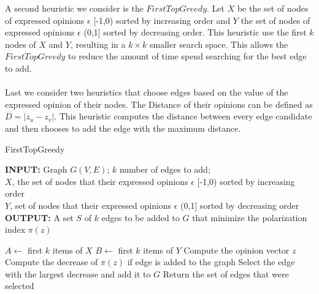 \noindent A second heuristic we consider is the $FirstTopGreedy$. Let $X$ be the set of nodes of expressed opinions $\epsilon$ [-1,0) sorted by increasing order and $Y$ the set of nodes of expressed opinions $\epsilon$ (0,1] sorted by decreasing order. This heuristic use the first $k$ nodes of $X$ and $Y$, resulting in  a $k \times k$ smaller search space. This allows the $FirstTopGreedy$ to reduce the amount of time spend searching for the best edge to add. \noindent 
\\
\\
Last we consider two heuristics that choose edges based on the value of the expressed opinion of their nodes. The Distance of their opinions can be defined as $D=|z_u - z_v|$. This heuristic computes the distance between every edge candidate and then chooses to add the edge with the maximum distance.

\begin{algorithm}[htbp]
	\caption{FirstTopGreedy}
	\label{alg:kgreedy}
	
	\begin{flushleft}
        		\textbf{INPUT:} Graph $G(V, E)$; $k$ number of edges to add;\\
		$X$, the set of nodes that their expressed opinions $\epsilon$ [-1,0) sorted by increasing order\\
		$Y$, set of nodes that their expressed opinions $\epsilon$ (0,1]  sorted by decreasing order\\
		\vspace{6pt}
        		\textbf{OUTPUT:} A set $S$ of $k$ edges to be added to $G$ that minimize the polarization \\ index $\pi(z)$
	\end{flushleft}
	
	\begin{algorithmic}[1]
		\STATE $A \leftarrow $ first $k$ items of $X$
		\STATE $B \leftarrow $ first $k$ items of $Y$
			\STATE Compute the opinion vector $z$
				\STATE Compute the decrease of $\pi(z)$ if edge is added to the graph
			\ENDFOR
			\STATE Select the edge with the largest decrease and add it to $G$
		\ENDFOR
		\STATE Return the set of edges that were selected
	\end{algorithmic}
	
\end{algorithm}
		
\clearpage


